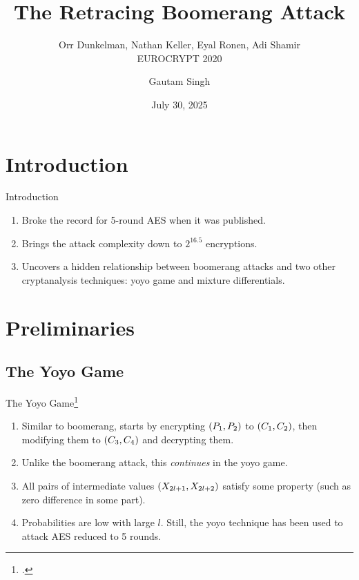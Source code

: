 \documentclass[notheorems]{beamer}
\title{The Retracing Boomerang Attack}
\subtitle{Orr Dunkelman, Nathan Keller, Eyal Ronen, Adi Shamir\\EUROCRYPT 2020}
\author{Gautam Singh}
\institute[IITH]{Indian Institute of Technology Hyderabad}
\date{July 30, 2025}
\theoremstyle{definition}
\theoremstyle{example}
\begin{document}
    
    \begin{frame}
        \titlepage
    \end{frame}
    
    \begin{frame}
        \tableofcontents[hideallsubsections]
    \end{frame}
    
    \section{Introduction}
    \label{sec:intro}
    
    \begin{frame}[<+->]{Introduction}
        \begin{enumerate}
            \item Broke the record for 5-round AES when it was
            published.
            \item Brings the attack complexity down to \(2^{16.5}\)
            encryptions.
            \item Uncovers a hidden relationship between boomerang attacks and
            two other cryptanalysis techniques: yoyo game and mixture
            differentials.
        \end{enumerate}
    \end{frame}

    \section{Preliminaries}
    \label{sec:prelims}

    \subsection{The Yoyo Game}
    \label{subsec:yoyo-game}
    
    \begin{frame}[<+->]{The Yoyo Game\footcite{ronjomYoyoTricksAES2017}}
        \begin{enumerate}
            \item Similar to boomerang, starts by encrypting \((P_1, P_2)\)
            to \((C_1, C_2)\), then modifying them to \((C_3, C_4)\)
            and decrypting them.
            \item Unlike the boomerang attack, this \emph{continues} in the yoyo
            game.
            \item All pairs of intermediate values \((X_{2l + 1}, X_{2l +
            2})\) satisfy some property (such as zero difference in some part).
            \item Probabilities are low with large \(l\). Still, the yoyo
            technique has been used to attack AES reduced to 5 rounds.
        \end{enumerate}
    \end{frame}
\end{document}
